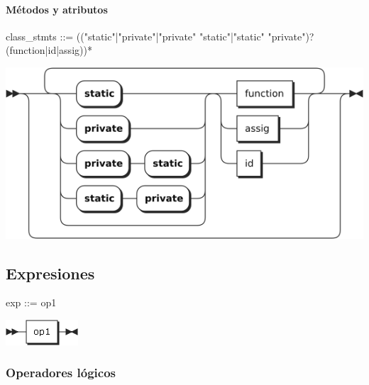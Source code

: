 \paragraph{Métodos y atributos}
\begin{myverbatim}
class_stmts ::= 
   (("static"|"private"|"private" "static"|"static" "private")? (function|id|assig))*

\end{myverbatim}  	
\begin{center}
\includegraphics[scale=0.7]{diagram/class_stmts.png} \\
\end{center}
\subsection {Expresiones}
\begin{multicols}{2}
\begin{myverbatim}      
exp ::= op1
\end{myverbatim}  
\columnbreak	
\begin{center}
\includegraphics[scale=0.5]{diagram/exp.png} \\
\end{center}
\end{multicols}
\subsubsection{Operadores lógicos}
